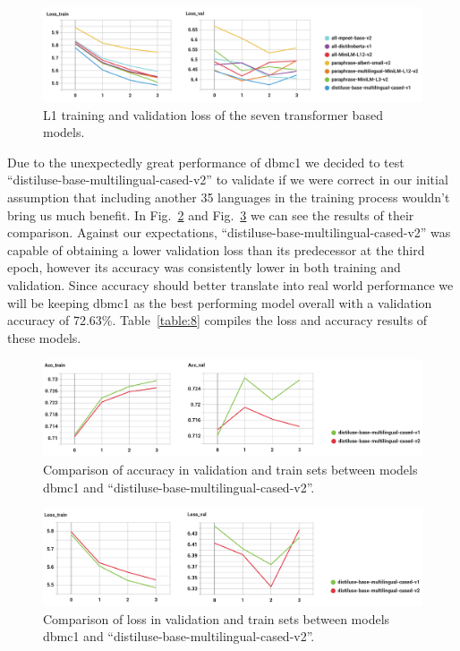 \begin{figure}[!ht]
\centerline{\includegraphics[width=1.1\textwidth]{figuras/7embeddings_transformer_-Loss.png}   }
\caption{L1 training and validation loss of the seven transformer based models. }
\label{7loss}
\end{figure}

Due to the unexpectedly great performance of dbmc1 we decided to test ``distiluse-base-multilingual-cased-v2'' to validate if we were correct in our initial assumption that including another 35 languages in the training process wouldn't  bring us much benefit. In Fig.~\ref{multilingual_acc} and Fig.~\ref{multilingual_loss} we can see the results of their comparison.
Against our expectations, ``distiluse-base-multilingual-cased-v2'' was capable of obtaining a lower validation  loss than its predecessor at the third epoch, however its accuracy was consistently lower in both training and validation. Since accuracy should better translate into real world performance we will be keeping dbmc1 as the best performing model overall with a validation accuracy of 72.63\%. Table~\ref{table:8} compiles the loss and accuracy results of these models.

\begin{figure}[!ht]
\centerline{\includegraphics[width=1.1\textwidth]{figuras/multilingual_1vs2_-Acc.png}   }
\caption{Comparison of accuracy in validation and train sets between models dbmc1 and ``distiluse-base-multilingual-cased-v2''.}
\label{multilingual_acc}
\end{figure}


\begin{figure}[!ht]
\centerline{\includegraphics[width=1.1\textwidth]{figuras/multilingual_1vs2_-Loss.png}   }
\caption{Comparison of loss in validation and train sets between models dbmc1 and ``distiluse-base-multilingual-cased-v2''.}
\label{multilingual_loss}
\end{figure}

